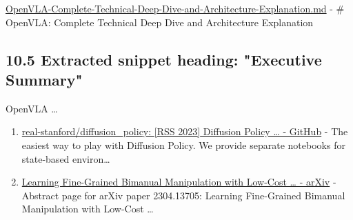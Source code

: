 \documentclass[
]{article}
\theoremstyle{remark}
\begin{document}
\begin{enumerate}
  \href{https://ppl-ai-file-upload.s3.amazonaws.com/web/direct-files/attachments/88949578/ebe1780a-f24e-40b1-902b-78a51b8a9e2a/OpenVLA-Complete-Technical-Deep-Dive-and-Architecture-Explanation.md?AWSAccessKeyId=ASIA2F3EMEYEWFOSVUXV&Signature=bklniz9s78YfIv9E9wLbQ\%2B76Elk\%3D&x-amz-security-token=IQoJb3JpZ2luX2VjEK\%2F\%2F\%2F\%2F\%2F\%2F\%2F\%2F\%2F\%2F\%2FwEaCXVzLWVhc3QtMSJIMEYCIQDDpTezZDLrSXNKyX0KXJVvg8aIGM3ajJVw26PkYq1JiwIhANlvgLK8NrgORWG1BCkmPYL6\%2BlyE2fSGnCR0naygAojjKvMECHgQARoMNjk5NzUzMzA5NzA1Igyua5Ul2dICkamsfzMq0ARjd6udXs2hJ\%2F58gAG\%2FOOv974OREVMX\%2FUksISbrEvg\%2FmW0SAOCOlRwEIfLgVgQcPs5eY\%2FxwWpy1W8gB8MlBQ9BJUxJKPq25Iw\%2Fw8gvkkTGmE5dQq1mxJ3BkgofizHgHUvpcTNrUXmXOPpL\%2FLgE74rtoDoR7wSlYUswYiegLZpRa9GUxOnlq7Q65l9xW4h6gk5G\%2FAMIXcC9rcS6KC6RyvgPEm4jnqeBURb37B6CeQvvDuGmhxZY2vCfVAH8EX5iuowO02B5EdgAR\%2BTykzFNsWd7uQU8fPoP4EPnTJmt88yxgC5x9mSNVPAVH5OxlFuaZEU\%2FJzeEjb8JrbGqlnzef\%2BOKGggJdY8KvQ6p5w8U3hO84NcrhYA94sn4TTOxh2MT5HQ1lc3ZMEPkDv1p9wiZYGRk8Bwllze\%2FZS2Txdw7S3baYF3AC6jTgU7AWv69j4DTBliqAvxE6wnX1s4WSpbQtB4yiLk7rQP9\%2F6bXnh5s7PRD1AViJk5m7lY7UobY5p3jgs\%2FYjtWG6l8yKrKddAHUb2z\%2FnoDEifcupct3NmUH6dGnZ3UmWbUJ5EfEq75c8Qq0aL2mLBugh6jpBK3NHSZtFMz\%2BLEzIuSynI44q9qB67YiCuoXFxbhy4vrUxQyh5wJzevapfSNvTtNuEawfMBVryBOKEHmQ6XNXDefBJaKK5iWtoejCPtoi7Dl2kiru41n52LokHCO45cJa2jtL920GwLc\%2BZ8xJ3JlKa2VvULDqwmiv8QBfoDR4kE\%2BgGrT8hnOW7MNtSSxyukiONK6CfF6F758szMLj\%2F1NAGOpcBZG4Qwf8otFDsFIpDnGsmYpK\%2FvQ2VB56MKr4rr1BUpJJ8yAo0Q\%2BKqQpPp6ILrtReAP5O2ko4Vx9Ynl3QsYkja8QZ2tMIeTMHnsSUvKNb0x54v\%2B2MbYo7bsL5BuB1ULddNB2FUymH1M35hA2Ag5z0836oZ4Z9cn722GAvZ0spsv0JQGDY6lAld94S\%2FSYW9WzeExLOrADOOcA\%3D\%3D&Expires=1779781003}{OpenVLA-Complete-Technical-Deep-Dive-and-Architecture-Explanation.md}
  - \# OpenVLA: Complete Technical Deep Dive and Architecture
  Explanation
\end{enumerate}

\subsection{10.5 Extracted snippet heading: "Executive Summary"}\label{executive-summary}

OpenVLA \ldots{}

\begin{enumerate}
\def\labelenumi{\arabic{enumi}.}
\setcounter{enumi}{10}
\item
  \href{https://github.com/real-stanford/diffusion_policy}{real-stanford/diffusion\_policy:
  {[}RSS 2023{]} Diffusion Policy \ldots{} - GitHub} - The easiest way
  to play with Diffusion Policy. We provide separate notebooks for
  state-based environ\ldots{}
\item
  \href{https://arxiv.org/abs/2304.13705}{Learning Fine-Grained Bimanual
  Manipulation with Low-Cost \ldots{} - arXiv} - Abstract page for arXiv
  paper 2304.13705: Learning Fine-Grained Bimanual Manipulation with
  Low-Cost \ldots{}
\end{enumerate}
\end{document}
